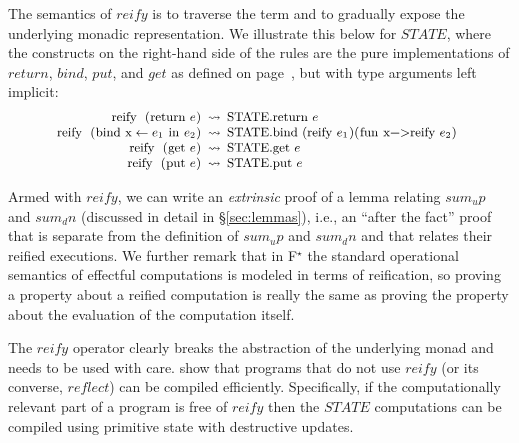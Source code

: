 \documentclass[sigplan,screen]{acmart}\settopmatter{}
\newcommand\fstar{F$^\star$\xspace}
\newcommand{\comm}[3]{\ifcheckpagebudget\else\ifdraft{\maybecolor{#1}[#2: #3]}\fi\fi}
\newcommand{\ch}[1]{\comm{teal}{CH}{#1}}
\begin{document}
The semantics of \ls$reify$ is to traverse the term and
to gradually expose the underlying
monadic representation. We illustrate this below for \ls$STATE$,
where the constructs on the right-hand side of the rules
are the pure implementations
of \ls$return$, \ls$bind$, \ls$put$, and \ls$get$ as defined on
page~\pageref{state}, but with type arguments left implicit:
\newcommand{\steps}[0]{\ensuremath{\leadsto}}
\newcommand{\stepss}[0]{\ensuremath{\steps^{*}}}
\[\small
\begin{array}{r@{\hspace{0.5em}}c@{\hspace{0.5em}}l}
\text{\ls$reify (return $}~e\text{\ls$)$} &\steps& \text{\ls$STATE.return $}~e\\
\text{\ls$reify (bind x $}\leftarrow e_1~\text{\ls$ in $}~e_2\ls$)$ &\steps&
\begin{array}{l}
  \hspace{-5pt}\text{\ls$STATE.bind (reify $}~e_1\text{\ls$)(fun x->reify $}~e_2\text{\ls$)$}
\end{array} \\
\text{\ls$reify (get $}~e\text{\ls$)$} &\steps& \text{\ls$STATE.get $}~e\\
\text{\ls$reify (put $}~e\text{\ls$)$} &\steps& \text{\ls$STATE.put $}~e
\end{array}
\]

Armed with \ls$reify$, we can write an \emph{extrinsic} proof of a
lemma relating \ls$sum_up$ and \ls$sum_dn$ (discussed in detail
in \S\ref{sec:lemmas}), i.e., an ``after the fact'' proof that
is separate from the definition of \ls$sum_up$ and \ls$sum_dn$
and that relates their reified executions.
%
We further remark that in \fstar{} the standard operational semantics
of effectful computations is modeled in terms of reification, so
proving a property about a reified computation is really the same as
proving the property about the evaluation of the computation itself.

The \ls$reify$ operator
clearly breaks the abstraction of the underlying monad and needs to be used
with care. \citet{dm4free} show that programs that do not use \ls$reify$
(or its converse, \ls$reflect$)
can be compiled efficiently. Specifically, if the
computationally relevant part of a program is free of \ls$reify$
then the \ls$STATE$ computations can be compiled
using primitive state with destructive updates.
\end{document}

